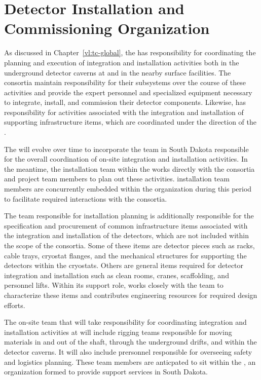 \chapter{Detector Installation and Commissioning Organization}
\label{ch:tc-jpo}

As discussed in Chapter~\ref{vl:tc-global}, the  has
responsibility for coordinating the planning and execution of 
 integration and installation activities both 
in the underground detector caverns at  and in the 
nearby surface facilities.  The  consortia maintain 
responsibility for their subsystems over the course of these 
activities and provide the expert personnel and specialized 
equipment necessary to integrate, install, and commission their 
detector components.  Likewise,  has responsibility 
for activities associated with the integration and installation 
of supporting infrastructure items, which are coordinated under 
the direction of the .       

The  will evolve over time to incorporate the team in South 
Dakota responsible for the overall coordination of on-site integration 
and installation activities.  In the meantime, the installation team 
within the  works directly with the  consortia 
and  project team members to plan out these activities.  
 installation team members are concurrently embedded 
within the   organization during this period to 
facilitate required interactions with the  consortia. 

The  team responsible for installation planning is additionally 
responsible for the specification and procurement of common infrastructure 
items associated with the integration and installation of the detectors, 
which are not included within the scope of the  consortia.  
Some of these items are detector pieces such as racks, cable trays, cryostat 
flanges, and the mechanical structures for supporting the detectors within 
the cryostats.  Others are general items required for detector integration 
and installation such as clean rooms, cranes, scaffolding, and personnel 
lifts.  Within its support role,   works closely with 
the  team to characterize these items and contributes engineering 
resources for required design efforts.

The on-site  team that will take responsibility for coordinating
integration and installation activities at  will include rigging 
teams responsible for moving materials in and out of the shaft, through the 
underground drifts, and within the detector caverns.  It will also include 
prersonnel responsible for overseeing safety and logistics planning.  These 
team members are anticpated to sit within the , an organization 
formed to provide  support services in South Dakota.    

